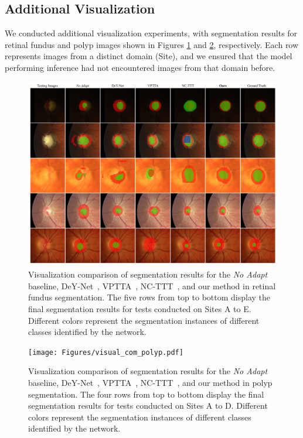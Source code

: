 \subsection{Additional Visualization}
We conducted additional visualization experiments, with segmentation results for retinal fundus and polyp images shown in Figures \ref{fig:vis_appendix_fundus} and \ref{fig:vis_appendix_poloy}, respectively. Each row represents images from a distinct domain (Site), and we ensured that the model performing inference had not encountered images from that domain before. 

\begin{figure}[!t]
    \centering
    \includegraphics[width=0.999\linewidth]{Figures/visual_com_fundus.pdf}
    \caption{Visualization comparison of segmentation results for the \textit{No Adapt} baseline, DeY-Net~\cite{wen2024denoising}, VPTTA~\cite{chen2024each}, NC-TTT~\cite{osowiechi2024nc}, and our method in retinal fundus segmentation. The five rows from top to bottom display the final segmentation results for tests conducted on Sites A to E. Different colors represent the segmentation instances of different classes identified by the network.}
    \label{fig:vis_appendix_fundus}
\end{figure}

\begin{figure}[!t]
    \centering
    \texttt{[image: Figures/visual\_com\_polyp.pdf]}
    \caption{Visualization comparison of segmentation results for the \textit{No Adapt} baseline, DeY-Net~\cite{wen2024denoising}, VPTTA~\cite{chen2024each}, NC-TTT~\cite{osowiechi2024nc}, and our method in polyp segmentation. The four rows from top to bottom display the final segmentation results for tests conducted on Sites A to D. Different colors represent the segmentation instances of different classes identified by the network.}
    \label{fig:vis_appendix_poloy}
\end{figure}

